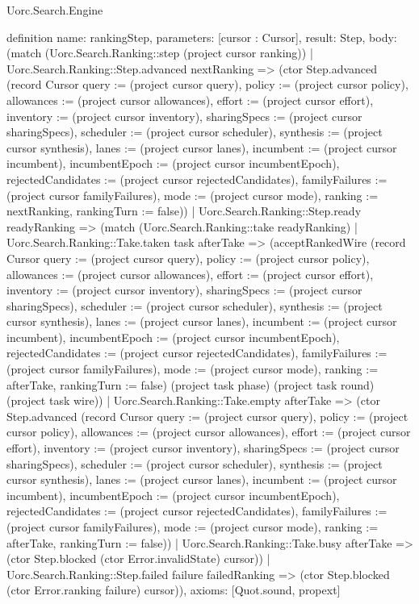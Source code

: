\begin{lexlean}{Uorc.Search.Engine}
\begin{semanticmodule}
definition{
  name: rankingStep,
  parameters: [cursor : Cursor],
  result: Step,
  body: (match (Uorc.Search.Ranking::step (project cursor ranking))
    | Uorc.Search.Ranking::Step.advanced nextRanking => (ctor Step.advanced (record Cursor {query := (project cursor query), policy := (project cursor policy), allowances := (project cursor allowances), effort := (project cursor effort), inventory := (project cursor inventory), sharingSpecs := (project cursor sharingSpecs), scheduler := (project cursor scheduler), synthesis := (project cursor synthesis), lanes := (project cursor lanes), incumbent := (project cursor incumbent), incumbentEpoch := (project cursor incumbentEpoch), rejectedCandidates := (project cursor rejectedCandidates), familyFailures := (project cursor familyFailures), mode := (project cursor mode), ranking := nextRanking, rankingTurn := false}))
    | Uorc.Search.Ranking::Step.ready readyRanking => (match (Uorc.Search.Ranking::take readyRanking)
      | Uorc.Search.Ranking::Take.taken task afterTake => (acceptRankedWire (record Cursor {query := (project cursor query), policy := (project cursor policy), allowances := (project cursor allowances), effort := (project cursor effort), inventory := (project cursor inventory), sharingSpecs := (project cursor sharingSpecs), scheduler := (project cursor scheduler), synthesis := (project cursor synthesis), lanes := (project cursor lanes), incumbent := (project cursor incumbent), incumbentEpoch := (project cursor incumbentEpoch), rejectedCandidates := (project cursor rejectedCandidates), familyFailures := (project cursor familyFailures), mode := (project cursor mode), ranking := afterTake, rankingTurn := false}) (project task phase) (project task round) (project task wire))
      | Uorc.Search.Ranking::Take.empty afterTake => (ctor Step.advanced (record Cursor {query := (project cursor query), policy := (project cursor policy), allowances := (project cursor allowances), effort := (project cursor effort), inventory := (project cursor inventory), sharingSpecs := (project cursor sharingSpecs), scheduler := (project cursor scheduler), synthesis := (project cursor synthesis), lanes := (project cursor lanes), incumbent := (project cursor incumbent), incumbentEpoch := (project cursor incumbentEpoch), rejectedCandidates := (project cursor rejectedCandidates), familyFailures := (project cursor familyFailures), mode := (project cursor mode), ranking := afterTake, rankingTurn := false}))
      | Uorc.Search.Ranking::Take.busy afterTake => (ctor Step.blocked (ctor Error.invalidState) cursor))
    | Uorc.Search.Ranking::Step.failed failure failedRanking => (ctor Step.blocked (ctor Error.ranking failure) cursor)),
  axioms: [Quot.sound, propext]
}


\end{semanticmodule}
\end{lexlean}
